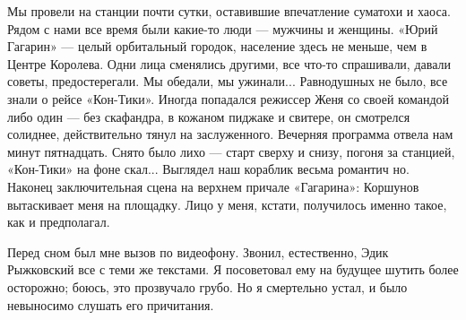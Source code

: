 \documentclass[11pt,a4paper,oneside]{article}
\begin{document}
Мы провели на станции почти сутки, оставившие впечатление суматохи и хаоса. Рядом с нами все время были какие-то люди — мужчины и женщины. «Юрий Гагарин» — целый орбитальный городок, население здесь не меньше, чем в Центре Королева. Одни лица сменялись другими, все что-то спрашивали, давали советы, предостерегали. Мы обедали, мы ужинали... Равнодушных не было, все знали о рейсе «Кон-Тики». Иногда попадался режиссер Женя со своей командой либо один — без скафандра, в кожаном пиджаке и свитере, он смотрелся солиднее, действительно тянул на заслуженного. Вечерняя программа отвела нам минут пятнадцать. Снято было лихо — старт сверху и снизу, погоня за станцией, «Кон-Тики» на фоне скал... Выглядел наш кораблик весьма романтич но. Наконец заключительная сцена на верхнем причале «Гагарина»: Коршунов вытаскивает меня на площадку. Лицо у меня, кстати, получилось именно такое, как и предполагал.

Перед сном был мне вызов по видеофону. Звонил, естественно, Эдик Рыжковский все с теми же текстами. Я посоветовал ему на будущее шутить более осторожно; боюсь, это прозвучало грубо. Но я смертельно устал, и было невыносимо слушать его причитания.
\end{document}

